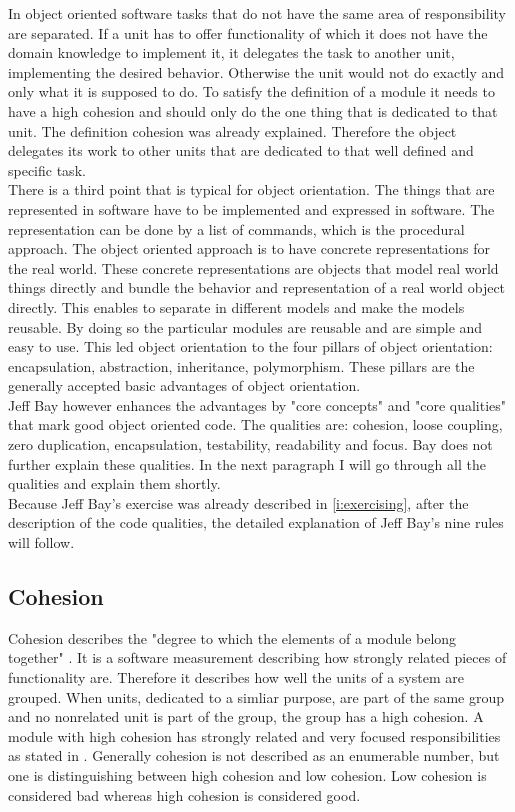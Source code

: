 In object oriented software tasks that do not have the same area of responsibility are separated. If a unit has to offer functionality of which it does not have the domain knowledge to implement it, it delegates the task to another unit, implementing the desired behavior. Otherwise the unit would not do exactly and only what it is supposed to do. To satisfy the definition of a module it needs to have a high cohesion and should only do the one thing that is dedicated to that unit. The definition cohesion was already explained. Therefore the object delegates its work to other units that are dedicated to that well defined and specific task. 
\\

There is a third point that is typical for object orientation. The things that are represented in software have to be implemented and expressed in software. The representation can be done by a list of commands, which is the procedural approach. The object oriented approach is to have concrete representations for the real world. These concrete representations are objects that model real world things directly and bundle the behavior and representation of a real world object directly. 
This enables to separate in different models and make the models reusable. By doing so the particular modules are reusable and are simple and easy to use. 
This led object orientation to the four pillars of object orientation: encapsulation, abstraction, inheritance, polymorphism. These pillars are the generally accepted basic advantages of object orientation. \\

Jeff Bay however enhances the advantages by "core concepts" and "core qualities" that mark good object oriented code. The qualities are: cohesion, loose coupling, zero duplication, encapsulation, testability, readability and focus.
Bay does not further explain these qualities. In the next paragraph I will go through all the qualities and explain them shortly. \\

Because Jeff Bay's exercise was already described in \ref{i:exercising}, after the description of the code qualities, the detailed explanation of Jeff Bay's nine rules will follow. 

\subsection*{Cohesion}
\label{cohesion}
Cohesion describes the "degree to which the elements of a module belong together" \cite{cohesionBook}. It is a software measurement describing how strongly related pieces of functionality are. Therefore it describes how well the units of a system are grouped. When units, dedicated to a simliar purpose, are part of the same group and no nonrelated unit is part of the group, the group has a high cohesion. A module with high cohesion has strongly related and very focused responsibilities as stated in \cite[Cohesion]{wiki}. Generally cohesion is not described as an enumerable number, but one is distinguishing between high cohesion and low cohesion. Low cohesion is considered bad whereas high cohesion is considered good.\\

